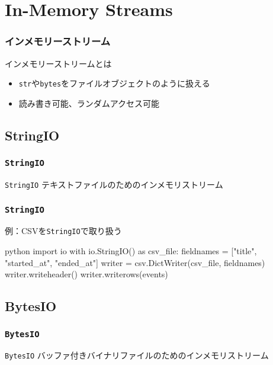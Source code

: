 \documentclass[aspectratio=169,dvipdfmx,14pt,notheorems]{beamer}
\theoremstyle{definition}
\begin{document}
\section{In-Memory Streams}

\begin{frame}\frametitle{インメモリーストリーム}
\begin{block}{インメモリーストリームとは}
\begin{itemize}
\item \texttt{str}や\texttt{bytes}をファイルオブジェクトのように扱える
\item 読み書き可能、ランダムアクセス可能
\end{itemize}
\end{block}
\end{frame}

\subsection{StringIO}

\begin{frame}\frametitle{\texttt{StringIO}}
\begin{block}{\texttt{StringIO}}
テキストファイルのためのインメモリストリーム
\end{block}
\end{frame}

\begin{frame}[fragile]\frametitle{\texttt{StringIO}}

\begin{exampleblock}{例：CSVを\texttt{StringIO}で取り扱う}
\begin{pygments}{python}
import io
with io.StringIO() as csv_file:
    fieldnames = ["title", "started_at", "ended_at"]
    writer = csv.DictWriter(csv_file, fieldnames)
    writer.writeheader()
    writer.writerows(events)
\end{pygments}
\end{exampleblock}

\end{frame}

\subsection{BytesIO}

\begin{frame}\frametitle{\texttt{BytesIO}}
\begin{block}{\texttt{BytesIO}}
バッファ付きバイナリファイルのためのインメモリストリーム
\end{block}
\end{frame}
\end{document}
